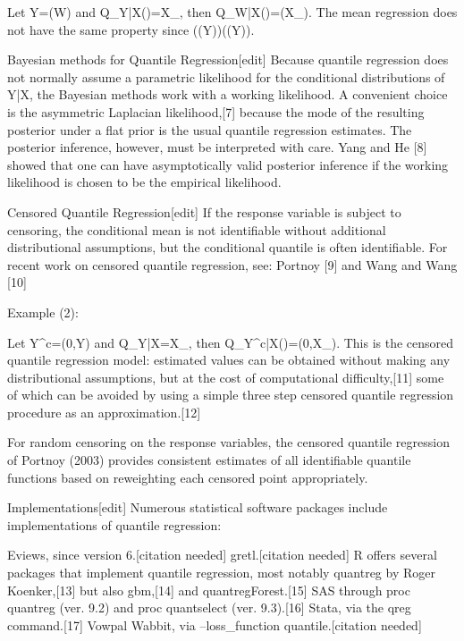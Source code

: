 Let Y=\ln(W) and Q_{Y|X}(\tau)=X\beta_{\tau}, then Q_{W|X}(\tau)=\exp(X\beta_{\tau}). The mean regression does not have the same property since  (\ln(Y))\neq \ln((Y)).

Bayesian methods for Quantile Regression[edit]
Because quantile regression does not normally assume a parametric likelihood for the conditional distributions of Y|X, the Bayesian methods work with a working likelihood. A convenient choice is the asymmetric Laplacian likelihood,[7] because the mode of the resulting posterior under a flat prior is the usual quantile regression estimates. The posterior inference, however, must be interpreted with care. Yang and He [8] showed that one can have asymptotically valid posterior inference if the working likelihood is chosen to be the empirical likelihood.

Censored Quantile Regression[edit]
If the response variable is subject to censoring, the conditional mean is not identifiable without additional distributional assumptions, but the conditional quantile is often identifiable. For recent work on censored quantile regression, see: Portnoy [9] and Wang and Wang [10]

Example (2):

Let Y^{c}=\max(0,Y) and Q_{Y|X}=X\beta_{\tau}, then Q_{Y^{c}|X}(\tau)=\max(0,X\beta_{\tau}). This is the censored quantile regression model: estimated values can be obtained without making any distributional assumptions, but at the cost of computational difficulty,[11] some of which can be avoided by using a simple three step censored quantile regression procedure as an approximation.[12]

For random censoring on the response variables, the censored quantile regression of Portnoy (2003) provides consistent estimates of all identifiable quantile functions based on reweighting each censored point appropriately.

Implementations[edit]
Numerous statistical software packages include implementations of quantile regression:

Eviews, since version 6.[citation needed]
gretl.[citation needed]
R offers several packages that implement quantile regression, most notably quantreg by Roger Koenker,[13] but also gbm,[14] and quantregForest.[15]
SAS through proc quantreg (ver. 9.2) and proc quantselect (ver. 9.3).[16]
Stata, via the qreg command.[17]
Vowpal Wabbit, via --loss_function quantile.[citation needed]
